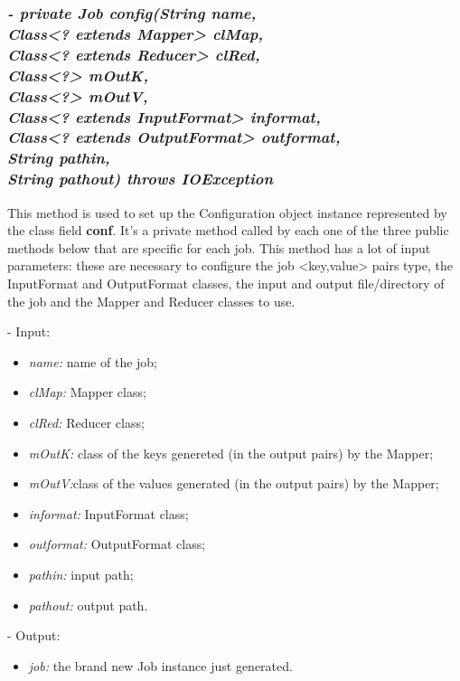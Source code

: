 \documentclass[]{report}
\begin{document}
	\subsubsection*{\textit{\textbf{-} private Job config(String name, \\
			       Class<? extends Mapper> clMap,\\ 
			       Class<? extends Reducer> clRed,\\
			       Class<?> mOutK, \\
			       Class<?> mOutV,\\
			       Class<? extends InputFormat> informat,\\ 
			       Class<? extends OutputFormat> outformat,\\
			       String pathin,\\
			       String pathout) throws IOException}}   	
	This method is used to set up the Configuration object instance represented by the class field \textbf{conf}. It's a private method called by each one of the three public methods below that are specific for each job. This method has a lot of input parameters: these are necessary to configure the job <key,value> pairs type, the InputFormat and OutputFormat classes, the input and output file/directory of the job and the Mapper and Reducer classes to use.    
	\begin{description}
		\item - Input:
		\begin{itemize}
			\item \textit{name:} name of the job;
			\item \textit{clMap:} Mapper class;
			\item \textit{clRed:} Reducer class;
			\item \textit{mOutK:} class of the keys genereted (in the output pairs) by the Mapper;
			\item \textit{mOutV:}class of the values generated (in the output pairs) by the Mapper;
			\item \textit{informat:} InputFormat class;
			\item \textit{outformat:} OutputFormat class;
			\item \textit{pathin:} input path;
			\item \textit{pathout:} output path.
		\end{itemize}
	\end{description}
	\begin{description}
		\item - Output:
		\begin{itemize}
			\item \textit{job:} the brand new Job instance just generated. 
		\end{itemize}
	\end{description}
	
\end{document}
